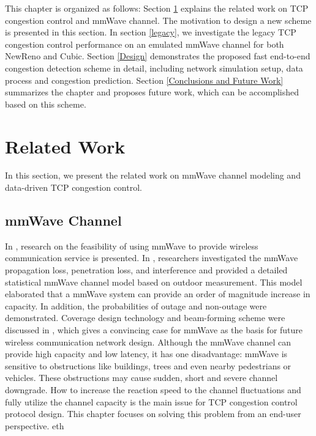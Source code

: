 \par This chapter is organized as follows: Section \ref{Related Work and Motivations} explains the related work on TCP congestion control and mmWave channel. The motivation to design a new scheme is presented in this section. In section \ref{legacy}, we investigate the legacy TCP congestion control performance on an emulated mmWave channel for both NewReno and Cubic. Section \ref{Design} demonstrates the proposed fast end-to-end congestion detection scheme in detail, including network simulation setup, data process and congestion prediction. Section \ref{Conclusions and Future Work} summarizes the chapter and proposes future work, which can be accomplished based on this scheme.

\section{Related Work}
\label{Related Work and Motivations}
In this section, we present the related work on mmWave channel modeling and data-driven TCP congestion control.  
\subsection{mmWave Channel}
\par In \cite{niu2015survey}\cite{rappaport2013millimeter}, research on the feasibility of using mmWave to provide wireless communication service is presented. In \cite{akdeniz2014millimeter}, researchers investigated the mmWave propagation loss, penetration loss, and interference and provided a detailed statistical mmWave channel model based on outdoor measurement. This model elaborated that a mmWave system can provide an order of magnitude increase in capacity. In addition, the probabilities of outage and non-outage were demonstrated. Coverage design technology and beam-forming scheme were discussed in\cite{sun2014millimeter} \cite{roh2014millimeter}, which gives a convincing case for mmWave as the basis for future wireless communication network design. Although the mmWave channel can provide high capacity and low latency, it has one disadvantage: mmWave is sensitive to obstructions like buildings, trees and even nearby pedestrians or vehicles. These obstructions may cause sudden, short and severe channel downgrade. How to increase the reaction speed to the channel fluctuations and fully utilize the channel capacity is the main issue for TCP congestion control protocol design. This chapter focuses on solving this problem from an end-user perspective.
eth

